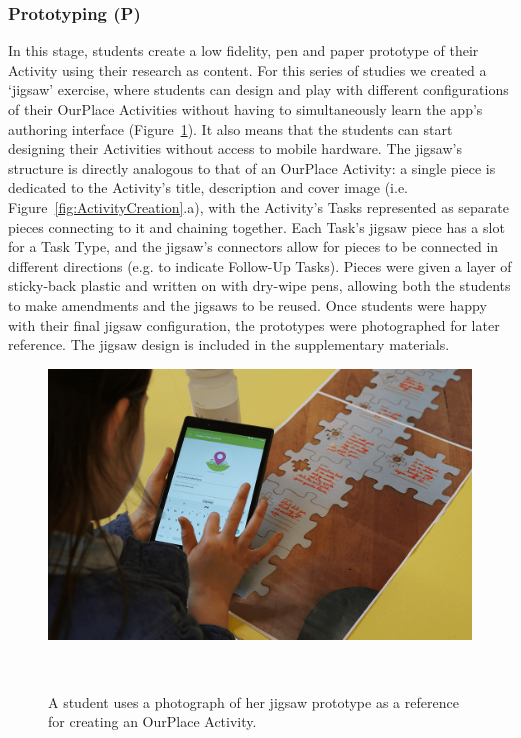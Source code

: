 \documentclass[,hyphens]{sigchi}
\begin{document}
\subsubsection{Prototyping (P)}
In this stage, students create a low fidelity, pen and paper prototype of their Activity using their research as content. For this series of studies we created a `jigsaw' exercise, where students can design and play with different configurations of their OurPlace Activities without having to simultaneously learn the app's authoring interface (Figure~\ref{fig:JigsawToApp}). It also means that the students can start designing their Activities without access to mobile hardware. The jigsaw's structure is directly analogous to that of an OurPlace Activity: a single piece is dedicated to the Activity's title, description and cover image (i.e. Figure~\ref{fig:ActivityCreation}.a), with the Activity's Tasks represented as separate pieces connecting to it and chaining together. Each Task's jigsaw piece has a slot for a Task Type, and the jigsaw's connectors allow for pieces to be connected in different directions (e.g. to indicate Follow-Up Tasks). Pieces were given a layer of sticky-back plastic and written on with dry-wipe pens, allowing  both the students to make amendments and the jigsaws to be reused. Once students were happy with their final jigsaw configuration, the prototypes were photographed for later reference. The jigsaw design is included in the supplementary materials.

\begin{figure}
\centering
  \includegraphics[width=1\columnwidth]{figures/jigsawToApp}
  \caption{A student uses a photograph of her jigsaw prototype as a reference for creating an OurPlace Activity.}~\label{fig:JigsawToApp}
\end{figure}
\end{document}

